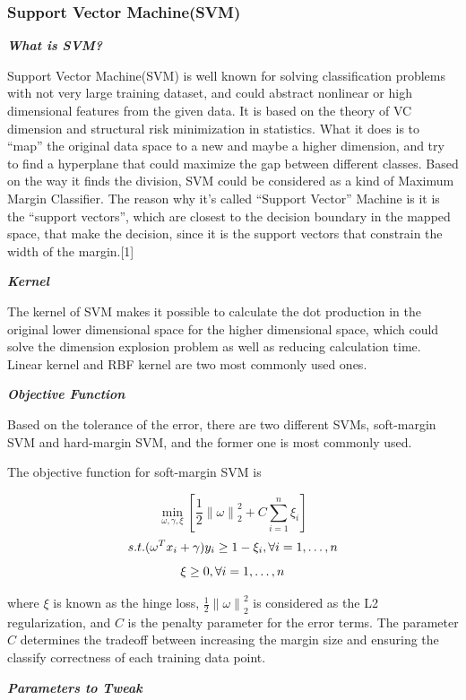 \documentclass[10pt]{article}
\begin{document}
\subsubsection{Support Vector Machine(SVM)}

\textit{\textbf{What is SVM?}}

Support Vector Machine(SVM) is well known for solving classification problems with not very large training dataset, and could abstract nonlinear or high dimensional features from the given data. It is based on the theory of VC dimension and structural risk minimization in statistics. What it does is to “map” the original data space to a new and maybe a higher dimension, and try to find a hyperplane that could maximize the gap between different classes. Based on the way it finds the division, SVM could be considered as a kind of Maximum Margin Classifier. The reason why it’s called “Support Vector” Machine is it is the “support vectors”, which are closest to the decision boundary in the mapped space, that make the decision, since it is the support vectors that constrain the width of the margin.[1]

\textit{\textbf{Kernel}}

The kernel of SVM makes it possible to calculate the dot production in the original lower dimensional space for the higher dimensional space, which could solve the dimension explosion problem as well as reducing calculation time. Linear kernel and RBF kernel are two most commonly used ones.

\textit{\textbf{Objective Function}}

Based on the tolerance of the error, there are two different SVMs, soft-margin SVM and hard-margin SVM, and the former one is most commonly used.

The objective function for soft-margin SVM is

$$ \min_{\omega , \gamma , \xi} \left[\frac{1}{2}\left \| \omega \right \| ^2 _2 + C \sum_{i=1}^n \xi _i \right]$$
$$ s.t. (\omega ^T   x _i + \gamma)y _i \geq 1- \xi _i , \space \forall i = 1, \ldots ,n  $$
$$ \xi \geq 0, \space \forall i = 1, \ldots ,n $$

where $ \xi $ is known as the hinge loss, $ \frac{1}{2}\left \| \omega \right \| ^2 _2 $ is considered as the L2 regularization, and $ C $ is the penalty parameter for the error terms. The parameter $ C $ determines the tradeoff between increasing the margin size and ensuring the classify correctness of each training data point.

\textit{\textbf{Parameters to Tweak}}
\end{document}
